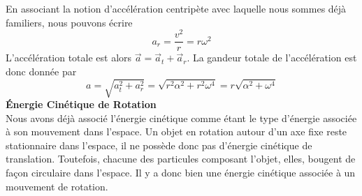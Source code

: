 \documentclass[titlepage,oneside,a4paper,11pt]{book} %
\begin{document}
En associant la notion d'accélération centripète avec laquelle nous sommes déjà familiers, nous pouvons écrire
\begin{equation}
a_r = \frac{v^2}{r}=r\omega^2
\end{equation}
L'accélération totale est alors $\vec{a}=\vec{a}_t+\vec{a}_r$. La gandeur totale de l'accélération est donc donnée par
\begin{equation}
a=\sqrt{a_{t}^{2}+a_{r}^{2}}=\sqrt{r^{2} \alpha^{2}+r^{2} \omega^{4}}=r \sqrt{\alpha^{2}+\omega^{4}}
\end{equation}
\newpage
{\large \textbf{Énergie Cinétique de Rotation}}\\

Nous avons déjà associé l'énergie cinétique comme étant le type d'énergie associée à son mouvement dans l'espace. Un objet en rotation autour d'un axe fixe reste stationnaire dans l'espace, il ne possède donc pas d'énergie cinétique de translation. Toutefois, chacune des particules composant l'objet, elles, bougent de façon circulaire dans l'espace. Il y a donc bien une énergie cinétique associée à un mouvement de rotation.\\
\end{document}
